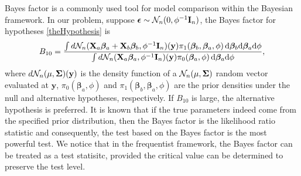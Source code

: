 \documentclass[11pt]{article}
\newcommand{\By}{\mathbf{y}}    \newcommand{\Bz}{\mathbf{z}}
\newcommand{\bfsym}[1]{\ensuremath{\boldsymbol{#1}}}
\def\bbeta{\bfsym \beta}
\theoremstyle{plain}
\theoremstyle{definition}
\theoremstyle{remark}
\begin{document}
Bayes factor \citep{Robert1995Bayes} is a commonly used tool for model comparison within the Bayesian framework.
In our problem, suppose $\bepsilon \sim \mathcal N_n (0,\phi^{-1} \BI_n)$, the Bayes factor for hypotheses \eqref{theHypothesis} is
\begin{equation*}
    B_{10}= \frac {
        \int d\mathcal N_n(\BX_a\bbeta_a + \BX_b\bbeta_b, \phi^{-1}\BI_n) (\By) \pi_1(\bbeta_b,\bbeta_a,\phi)\, \mathrm d\bbeta_b \mathrm d\bbeta_a \mathrm d\phi
}{
    \int d\mathcal N_n(\BX_a\bbeta_a, \phi^{-1} \BI_n)(\By) \pi_0(\bbeta_a,\phi) \, \mathrm d\bbeta_a \mathrm d\phi
    },
\end{equation*}
where $d\mathcal N_n(\mu, \bSigma)(\By)$ is the density function of a $\mathcal N_n(\mu,\bSigma) $ random vector evaluated at $\By$,  $\pi_0(\bbeta_a,\phi)$ and $\pi_1(\bbeta_b,\bbeta_a,\phi)$ are the prior densities under the null and alternative hypotheses, respectively.
If $B_{10}$ is large, the alternative hypothesis is preferred.
It is known that if the true parameters indeed come from the specified prior distribution, then the Bayes factor is the likelihood ratio statistic and consequently, the test based on the Bayes factor is the most powerful test.
We notice that in the frequentist framework, the Bayes factor can be treated as a test statisitc, provided the critical value can be determined to preserve the test level.
\end{document}
